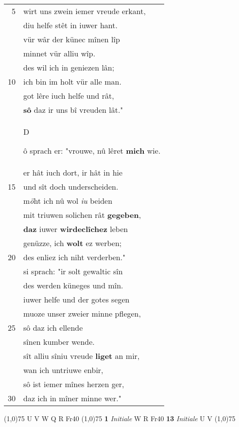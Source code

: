 \documentclass[8pt,a4paper,notitlepage]{article}
\begin{document}
\begin{table}[ht]
\begin{minipage}[t]{0.5\linewidth}
\begin{tabular}{rl}
5 & wirt uns zwein iemer vreude erkant,\\ 
 & diu helfe stêt in iuwer hant.\\ 
 & vür wâr der künec mînen lîp\\ 
 & minnet vür alliu wîp.\\ 
 & des wil ich in geniezen lân;\\ 
10 & ich bin im holt vür alle man.\\ 
 & got lêre iuch helfe und rât,\\ 
 & \textbf{sô} daz ir uns bî vreuden lât."\\ 
 & \begin{large}D\end{large}ô sprach er: "vrouwe, nû lêret \textbf{mich} wie.\\ 
 & er hât iuch dort, ir hât in hie\\ 
15 & und sît doch underscheiden.\\ 
 & m\textit{ö}ht ich nû wol \textit{iu} beiden\\ 
 & mit triuwen solichen rât \textbf{gegeben},\\ 
 & \textbf{daz} iuwer \textbf{wirdeclîchez} leben\\ 
 & genüzze, ich \textbf{wolt} ez werben;\\ 
20 & des enliez ich niht verderben."\\ 
 & si sprach: "ir solt gewaltic sîn\\ 
 & des werden küneges und mîn.\\ 
 & iuwer helfe und der gotes segen\\ 
 & muoze unser zweier minne pflegen,\\ 
25 & sô daz ich ellende\\ 
 & sînen kumber wende.\\ 
 & sît alliu sîniu vreude \textbf{liget} an mir,\\ 
 & wan ich untriuwe enbir,\\ 
 & sô ist iemer mînes herzen ger,\\ 
30 & daz ich in mîner minne wer."\\ 
\end{tabular}
\scriptsize
\line(1,0){75} \newline
U V W Q R Fr40 \newline
\line(1,0){75} \newline
\textbf{1} \textit{Initiale} W R Fr40  \textbf{13} \textit{Initiale} U V  \newline
\line(1,0){75} \newline

\end{minipage}
\end{table}
\end{document}

